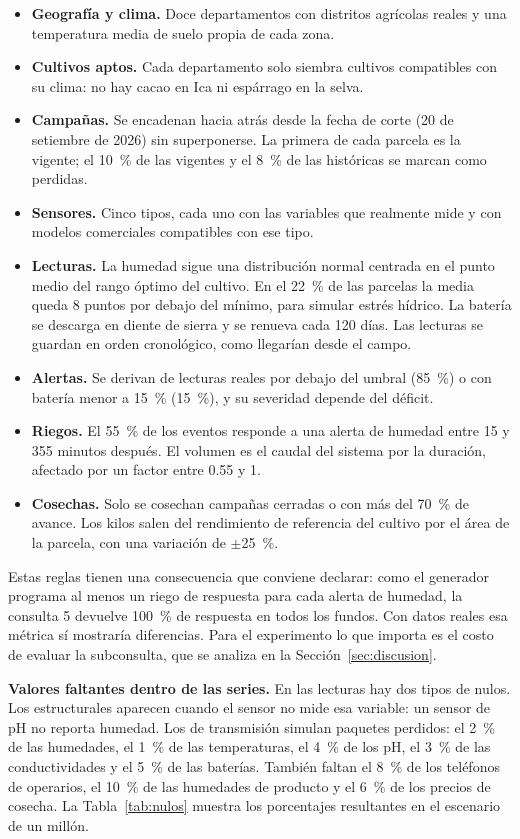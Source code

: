 \documentclass[11pt,letterpaper]{article}
\begin{document}
\begin{itemize}[leftmargin=1.4em,itemsep=0.1em]
\item \textbf{Geografía y clima.} Doce departamentos con distritos agrícolas reales y una temperatura media de suelo propia de cada zona.
\item \textbf{Cultivos aptos.} Cada departamento solo siembra cultivos compatibles con su clima: no hay cacao en Ica ni espárrago en la selva.
\item \textbf{Campañas.} Se encadenan hacia atrás desde la fecha de corte (20 de setiembre de 2026) sin superponerse. La primera de cada parcela es la vigente; el 10~\% de las vigentes y el 8~\% de las históricas se marcan como perdidas.
\item \textbf{Sensores.} Cinco tipos, cada uno con las variables que realmente mide y con modelos comerciales compatibles con ese tipo.
\item \textbf{Lecturas.} La humedad sigue una distribución normal centrada en el punto medio del rango óptimo del cultivo. En el 22~\% de las parcelas la media queda 8 puntos por debajo del mínimo, para simular estrés hídrico. La batería se descarga en diente de sierra y se renueva cada 120 días. Las lecturas se guardan en orden cronológico, como llegarían desde el campo.
\item \textbf{Alertas.} Se derivan de lecturas reales por debajo del umbral (85~\%) o con batería menor a 15~\% (15~\%), y su severidad depende del déficit.
\item \textbf{Riegos.} El 55~\% de los eventos responde a una alerta de humedad entre 15 y 355 minutos después. El volumen es el caudal del sistema por la duración, afectado por un factor entre 0.55 y 1.
\item \textbf{Cosechas.} Solo se cosechan campañas cerradas o con más del 70~\% de avance. Los kilos salen del rendimiento de referencia del cultivo por el área de la parcela, con una variación de $\pm$25~\%.
\end{itemize}

Estas reglas tienen una consecuencia que conviene declarar: como el generador programa al menos un riego de respuesta para cada alerta de humedad, la consulta 5 devuelve 100~\% de respuesta en todos los fundos. Con datos reales esa métrica sí mostraría diferencias. Para el experimento lo que importa es el costo de evaluar la subconsulta, que se analiza en la Sección~\ref{sec:discusion}.

\textbf{Valores faltantes dentro de las series.} En las lecturas hay dos tipos de nulos. Los estructurales aparecen cuando el sensor no mide esa variable: un sensor de pH no reporta humedad. Los de transmisión simulan paquetes perdidos: el 2~\% de las humedades, el 1~\% de las temperaturas, el 4~\% de los pH, el 3~\% de las conductividades y el 5~\% de las baterías. También faltan el 8~\% de los teléfonos de operarios, el 10~\% de las humedades de producto y el 6~\% de los precios de cosecha. La Tabla~\ref{tab:nulos} muestra los porcentajes resultantes en el escenario de un millón.
\end{document}
